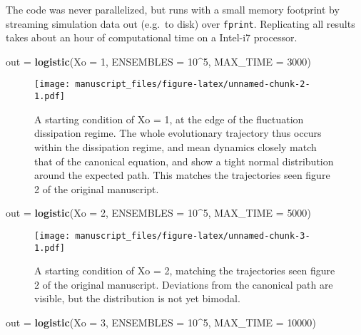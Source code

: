\documentclass[
]{rescience}
\newenvironment{Shaded}{\begin{snugshade}}{\end{snugshade}}
\newcommand{\DataTypeTok}[1]{\textcolor[rgb]{0.13,0.29,0.53}{#1}}
\newcommand{\DecValTok}[1]{\textcolor[rgb]{0.00,0.00,0.81}{#1}}
\newcommand{\KeywordTok}[1]{\textcolor[rgb]{0.13,0.29,0.53}{\textbf{#1}}}
\newcommand{\NormalTok}[1]{#1}
\newcommand{\OperatorTok}[1]{\textcolor[rgb]{0.81,0.36,0.00}{\textbf{#1}}}
\newcommand{\StringTok}[1]{\textcolor[rgb]{0.31,0.60,0.02}{#1}}
\begin{document}
The code was never parallelized, but runs with a small memory footprint
by streaming simulation data out (e.g.~to disk) over \texttt{fprint}.
Replicating all results takes about an hour of computational time on a
Intel-i7 processor.

\begin{Shaded}
\begin{Highlighting}[]
\NormalTok{out =}\StringTok{ }\KeywordTok{logistic}\NormalTok{(}\DataTypeTok{Xo =} \DecValTok{1}\NormalTok{,  }\DataTypeTok{ENSEMBLES =} \DecValTok{10}\OperatorTok{^}\DecValTok{5}\NormalTok{, }\DataTypeTok{MAX_TIME =} \DecValTok{3000}\NormalTok{)}
\end{Highlighting}
\end{Shaded}

\begin{figure}
\centering
\texttt{[image: manuscript\_files/figure-latex/unnamed-chunk-2-1.pdf]}
\caption{A starting condition of Xo = 1, at the edge of the fluctuation
dissipation regime. The whole evolutionary trajectory thus occurs within
the dissipation regime, and mean dynamics closely match that of the
canonical equation, and show a tight normal distribution around the
expected path. This matches the trajectories seen figure 2 of the
original manuscript.}
\end{figure}

\begin{Shaded}
\begin{Highlighting}[]
\NormalTok{out =}\StringTok{ }\KeywordTok{logistic}\NormalTok{(}\DataTypeTok{Xo =} \DecValTok{2}\NormalTok{,  }\DataTypeTok{ENSEMBLES =} \DecValTok{10}\OperatorTok{^}\DecValTok{5}\NormalTok{, }\DataTypeTok{MAX_TIME =} \DecValTok{5000}\NormalTok{)}
\end{Highlighting}
\end{Shaded}

\begin{figure}
\centering
\texttt{[image: manuscript\_files/figure-latex/unnamed-chunk-3-1.pdf]}
\caption{A starting condition of Xo = 2, matching the trajectories seen
figure 2 of the original manuscript. Deviations from the canonical path
are visible, but the distribution is not yet bimodal.}
\end{figure}

\begin{Shaded}
\begin{Highlighting}[]
\NormalTok{out =}\StringTok{ }\KeywordTok{logistic}\NormalTok{(}\DataTypeTok{Xo =} \DecValTok{3}\NormalTok{,  }\DataTypeTok{ENSEMBLES =} \DecValTok{10}\OperatorTok{^}\DecValTok{5}\NormalTok{, }\DataTypeTok{MAX_TIME =} \DecValTok{10000}\NormalTok{)}
\end{Highlighting}
\end{Shaded}
\end{document}
